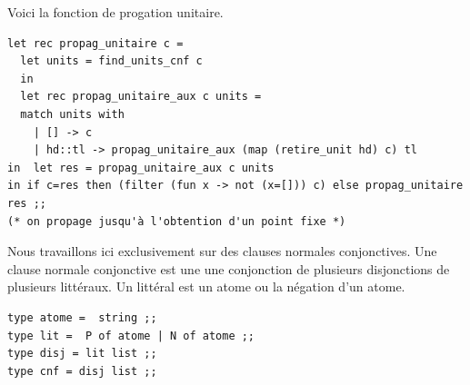 \documentclass[11pt]{book}
\begin{document}
Voici la fonction de progation unitaire.
\begin{Verbatim}
let rec propag_unitaire c =
  let units = find_units_cnf c 
  in 
  let rec propag_unitaire_aux c units =
  match units with 
    | [] -> c
    | hd::tl -> propag_unitaire_aux (map (retire_unit hd) c) tl 
in  let res = propag_unitaire_aux c units
in if c=res then (filter (fun x -> not (x=[])) c) else propag_unitaire res ;;
(* on propage jusqu'à l'obtention d'un point fixe *)
\end{Verbatim}
	
Nous travaillons ici exclusivement sur des clauses normales conjonctives.
Une clause normale conjonctive est une une conjonction de plusieurs disjonctions de plusieurs littéraux.
Un littéral est un atome ou la négation d'un atome.
\begin{Verbatim}
type atome =  string ;;
type lit =  P of atome | N of atome ;;
type disj = lit list ;; 
type cnf = disj list ;;
\end{Verbatim}
\end{document}

